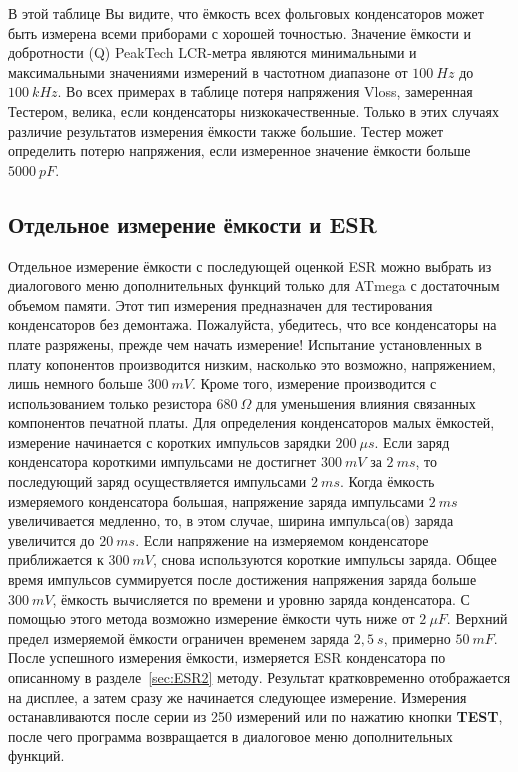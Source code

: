В этой таблице Вы видите, что ёмкость всех фольговых конденсаторов может быть измерена всеми приборами с хорошей 
точностью. Значение ёмкости и добротности (Q)  PeakTech LCR-метра являются минимальными и максимальными значениями 
измерений в частотном диапазоне от \(100~Hz\) до \(100~kHz\).
Во всех примерах в таблице потеря напряжения Vloss, замеренная Тестером, велика, если конденсаторы низкокачественные. 
Только в этих случаях различие результатов измерения ёмкости также большие. Тестер может определить потерю напряжения, 
если измеренное значение ёмкости больше \(5000~pF\).

\subsection{Отдельное измерение ёмкости и ESR}
Отдельное измерение ёмкости с последующей оценкой ESR можно выбрать из диалогового меню дополнительных функций
только для ATmega с достаточным объемом памяти. Этот тип измерения предназначен для тестирования конденсаторов
без демонтажа.
Пожалуйста, убедитесь, что все конденсаторы на плате разряжены, прежде чем начать измерение!
Испытание установленных в плату копонентов производится низким, насколько это возможно,
напряжением, лишь немного больше \(300~mV\).
Кроме того, измерение производится с использованием только резистора \(680~\Omega\) для 
уменьшения влияния связанных компонентов печатной платы.
Для определения конденсаторов малых ёмкостей, измерение начинается с коротких импульсов 
зарядки \(200~\mu s\). Если заряд конденсатора короткими импульсами не достигнет \(300~mV\) 
за \(2~ms\), то последующий заряд осуществляется импульсами \(2~ms\).
Когда ёмкость измеряемого конденсатора большая, напряжение заряда импульсами \(2~ms\) увеличивается медленно,
то, в этом случае, ширина импульса(ов) заряда увеличится до \(20~ms\).
Если напряжение на измеряемом конденсаторе приближается к \(300~mV\), снова используются
короткие импульсы заряда.
Общее время импульсов суммируется после достижения напряжения заряда больше \(300~mV\),
ёмкость вычисляется по времени и уровню заряда конденсатора.
С помощью этого метода возможно измерение ёмкости чуть ниже от \(2~\mu F\). Верхний предел измеряемой ёмкости
ограничен временем заряда \(2,5~s\), примерно \(50~mF\).
После успешного измерения ёмкости, измеряется ESR конденсатора по описанному 
в разделе~\ref{sec:ESR2} методу.
Результат кратковременно отображается на дисплее, а затем сразу же начинается следующее измерение.        
Измерения останавливаются после серии из 250 измерений или по нажатию кнопки \textbf{ TEST},
после чего программа возвращается в диалоговое меню дополнительных функций.



